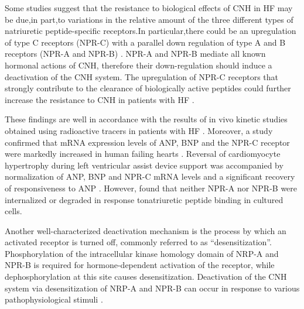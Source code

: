 \documentclass[14pt,a4paper,onecolumn]{extarticle}
\begin{document}
Some studies suggest that the resistance to biological effects of CNH in HF may be due,in part,to variations in the relative amount of the three different types of natriuretic peptide-specific receptors.In particular,there could be an upregulation of type C receptors (NPR-C) with a parallel down regulation of type A and B receptors (NPR-A and NPR-B) \citep{bib343} \citep{bib344} \citep{bib345} \citep{bib346} \citep{bib347}. NPR-A and NPR-B mediate all known hormonal actions of CNH, therefore their down-regulation should induce a deactivation of the CNH system. The upregulation of NPR-C receptors that strongly contribute to the clearance of biologically active peptides could further increase the resistance to CNH in patients with HF \citep{bib343}.

These findings are well in accordance with the results of in vivo kinetic studies obtained using radioactive tracers in patients with HF \citep{bib332} \citep{bib333}. Moreover, a  study confirmed that mRNA expression levels of ANP, BNP and the NPR-C receptor were markedly increased in human failing hearts \citep{bib346}. Reversal of cardiomyocyte hypertrophy during left ventricular assist device support was accompanied by normalization of ANP, BNP and NPR-C mRNA levels and a significant recovery of responsiveness to ANP \citep{bib347}.  However,  \citep{bib348} found that neither NPR-A nor NPR-B were internalized or degraded in response tonatriuretic peptide binding in %
cultured cells.

Another well-characterized deactivation mechanism is the process by which an activated receptor is turned off, commonly referred to as “desensitization”. Phosphorylation of the intracellular kinase homology domain of NRP-A and NPR-B is required for hormone-dependent activation of the receptor, while dephosphorylation at this site causes desensitization. Deactivation of the CNH system via desensitization of NRP-A and NPR-B can occur in response to various pathophysiological stimuli \citep{bib348} \citep{bib349} \citep{bib350} .

\end{document}
